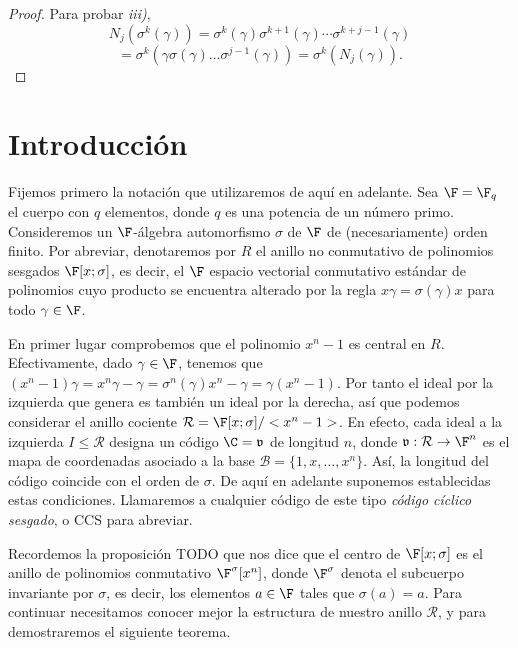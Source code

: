 \begin{proof}
Para probar \textit{iii)},
    \[
    N_j(\sigma^k(\gamma)) = \sigma^k(\gamma)\sigma^{k+1}(\gamma)\cdots\sigma^{k+j-1}(\gamma)
\]
\[
    = \sigma^k(\gamma \sigma(\gamma)\dots\sigma^{j-1}(\gamma)) = \sigma^k(N_j(\gamma))
    .\]
\end{proof}

\section{Introducción}

Fijemos primero la notación que utilizaremos de aquí en adelante. Sea \(\F = \F_q\) el cuerpo con \(q\) elementos, donde \(q\) es una potencia de un número primo. Consideremos un \(\F\)-álgebra automorfismo \(\sigma\) de \(\F\) de (necesariamente) orden finito. Por abreviar, denotaremos por \(R\) el anillo no conmutativo de polinomios sesgados \(\F[x;\sigma]\), es decir, el \(\F\) espacio vectorial conmutativo estándar de polinomios cuyo producto se encuentra alterado por la regla \(x\gamma = \sigma(\gamma)x\) para todo  \(\gamma \in \F\).

En primer lugar comprobemos que el polinomio \(x^n -1\) es central en \(R\). Efectivamente, dado \(\gamma \in \F\), tenemos que \((x^n-1)\gamma= x^n \gamma - \gamma = \sigma^n(\gamma)x^n - \gamma = \gamma(x^n -1)\). Por tanto el ideal por la izquierda que genera es también un ideal por la derecha, así que podemos considerar el anillo cociente \(\mathcal{R} = \F[x;\sigma] / <x^n -1>\). En efecto, cada ideal a la izquierda \(I \leq \mathcal{R}\) designa un código \(\C =\mathfrak{v} \) de longitud  \(n\), donde  \(\mathfrak{v}:\mathcal{R} \rightarrow \F^n\) es el mapa de coordenadas asociado a la base \(\mathcal{B} = \{1, x, \dots, x^n\}\). Así, la longitud del código coincide con el orden de \(\sigma\). De aquí en adelante suponemos establecidas estas condiciones. Llamaremos a cualquier código de este tipo \textit{código cíclico sesgado}, o CCS para abreviar.

Recordemos la proposición TODO que nos dice que el centro de \(\F[x;\sigma]\) es el anillo de polinomios conmutativo  \(\F^\sigma[x^n]\), donde  \(\F^\sigma\) denota el subcuerpo invariante por  \(\sigma\), es decir, los elementos  \(a \in \F\) tales que  \(\sigma(a) = a\). Para continuar necesitamos conocer mejor la estructura de nuestro anillo \(\mathcal{R}\), y para demostraremos el siguiente teorema.


